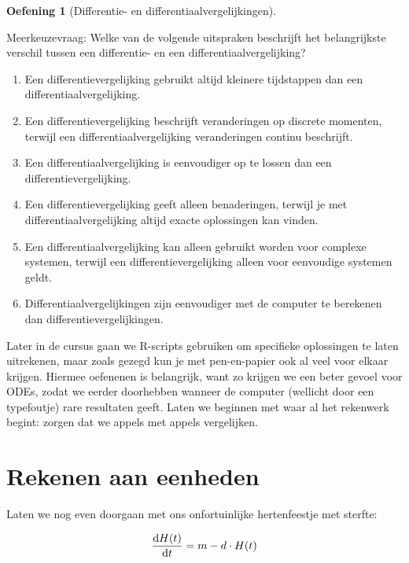 \documentclass[
  a4paper,
]{scrbook}
\theoremstyle{definition}
\newtheorem{exercise}{Oefening}[chapter]
\theoremstyle{remark}
\begin{document}
\begin{exercise}[Differentie- en
differentiaalvergelijkingen]\protect\hypertarget{exr-diffvsdiff}{}\label{exr-diffvsdiff}

Meerkeuzevraag: Welke van de volgende uitspraken beschrijft het
belangrijkste verschil tussen een differentie- en een
differentiaalvergelijking?

\begin{enumerate}
\def\labelenumi{\Alph{enumi})}
\item
  Een differentievergelijking gebruikt altijd kleinere tijdstappen dan
  een differentiaalvergelijking.
\item
  Een differentievergelijking beschrijft veranderingen op discrete
  momenten, terwijl een differentiaalvergelijking veranderingen continu
  beschrijft.
\item
  Een differentiaalvergelijking is eenvoudiger op te lossen dan een
  differentievergelijking.
\item
  Een differentievergelijking geeft alleen benaderingen, terwijl je met
  differentiaalvergelijking altijd exacte oplossingen kan vinden.
\item
  Een differentiaalvergelijking kan alleen gebruikt worden voor complexe
  systemen, terwijl een differentievergelijking alleen voor eenvoudige
  systemen geldt.
\item
  Differentiaalvergelijkingen zijn eenvoudiger met de computer te
  berekenen dan differentievergelijkingen.
\end{enumerate}

\end{exercise}

Later in de cursus gaan we R-scripts gebruiken om specifieke oplossingen
te laten uitrekenen, maar zoals gezegd kun je met pen-en-papier ook al
veel voor elkaar krijgen. Hiermee oefenenen is belangrijk, want zo
krijgen we een beter gevoel voor ODEs, zodat we eerder doorhebben
wanneer de computer (wellicht door een typefoutje) rare resultaten
geeft. Laten we beginnen met waar al het rekenwerk begint: zorgen dat we
appels met appels vergelijken.

\section{Rekenen aan eenheden}\label{sec-odes-eenheden}

Laten we nog even doorgaan met ons onfortuinlijke hertenfeestje met
sterfte:

\begin{align}
\mathchoice{\frac{\mathrm{d}H(t)}
{\mathrm{d}t}}{\mathrm{d}H(t)/\mathrm{d}t}
{\mathrm{d}H(t)/\mathrm{d}t}
{\mathrm{d}H(t)/\mathrm{d}t} = m - d \cdot H(t)
\end{align}
\end{document}
